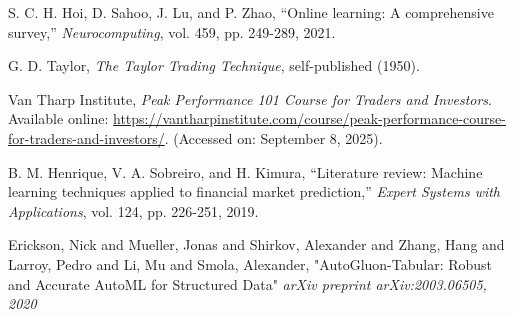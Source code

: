 \documentclass[10pt]{article}
\begin{document}
\begin{thebibliography}{99}
S. C. H. Hoi, D. Sahoo, J. Lu, and P. Zhao, “Online learning: A comprehensive survey,” \emph{Neurocomputing}, vol. 459, pp. 249-289, 2021.

G. D. Taylor, \textit{The Taylor Trading Technique}, self-published (1950).

Van Tharp Institute, \textit{Peak Performance 101 Course for Traders and Investors}. Available online: \url{https://vantharpinstitute.com/course/peak-performance-course-for-traders-and-investors/}. (Accessed on: September 8, 2025).

B. M. Henrique, V. A. Sobreiro, and H. Kimura, “Literature review: Machine learning techniques applied to financial market prediction,” \emph{Expert Systems with Applications}, vol. 124, pp. 226-251, 2019.

Erickson, Nick and Mueller, Jonas and Shirkov, Alexander and Zhang, Hang and Larroy, Pedro and Li, Mu and Smola, Alexander, "AutoGluon-Tabular: Robust and Accurate AutoML for Structured Data"
\emph{arXiv preprint arXiv:2003.06505, 2020}

\end{thebibliography}
\end{document}
